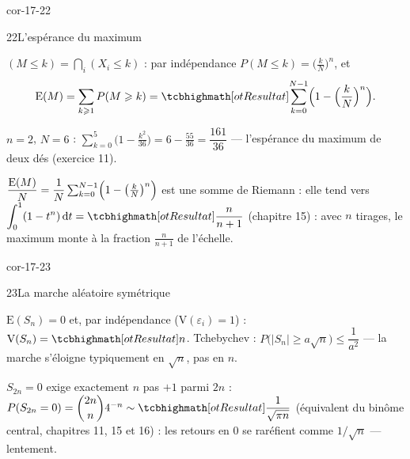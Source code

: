 \begin{blocLivre}{cor-17-22}
\begin{corrige}{22}{L'espérance du maximum}
\begin{questions}
  \item $(M\leqslant k)=\bigcap_i(X_i\leqslant k)$ : par indépendance
    $P(M\leqslant k)=\bigl(\tfrac kN\bigr)^{n}$, et
    \[
    \mathrm{E}(M)=\sum_{k\geqslant1}P(M\geqslant k)
    =\res{\sum_{k=0}^{N-1}\Bigl(1-\Bigl(\frac kN\Bigr)^{n}\Bigr)} .
    \]
  \item $n=2$, $N=6$ :
    $\sum_{k=0}^{5}\bigl(1-\tfrac{k^{2}}{36}\bigr)=6-\tfrac{55}{36}
    =\dfrac{161}{36}$ — l'espérance du maximum de deux dés
    (exercice 11).
  \item $\dfrac{\mathrm{E}(M)}{N}=\dfrac1N\sum_{k=0}^{N-1}
    \Bigl(1-\bigl(\tfrac kN\bigr)^{n}\Bigr)$ est une somme de Riemann :
    elle tend vers
    $\displaystyle\int_{0}^{1}(1-t^{n})\,\mathrm{d}t=\res{\frac{n}{n+1}}$
    (chapitre 15) : avec $n$ tirages, le maximum monte à la fraction
    $\frac{n}{n+1}$ de l'échelle.
\end{questions}
\end{corrige}
\end{blocLivre}

\begin{blocLivre}{cor-17-23}
\begin{corrige}{23}{La marche aléatoire symétrique}
\begin{questions}
  \item $\mathrm{E}(S_n)=0$ et, par indépendance
    ($\mathrm{V}(\varepsilon_i)=1$) : $\mathrm{V}(S_n)=\res{n}$.
    Tchebychev : $P\bigl(|S_n|\geqslant a\sqrt n\bigr)\leqslant\dfrac{1}{a^{2}}$ —
    la marche s'éloigne typiquement en $\sqrt n$, pas en $n$.
  \item $S_{2n}=0$ exige exactement $n$ pas $+1$ parmi $2n$ :
    $P(S_{2n}=0)=\dbinom{2n}{n}4^{-n}
    \sim\res{\dfrac{1}{\sqrt{\pi n}}}$ (équivalent du binôme central,
    chapitres 11, 15 et 16) : les retours en $0$ se raréfient comme
    $1/\sqrt n$ — lentement.
\end{questions}
\end{corrige}
\end{blocLivre}

